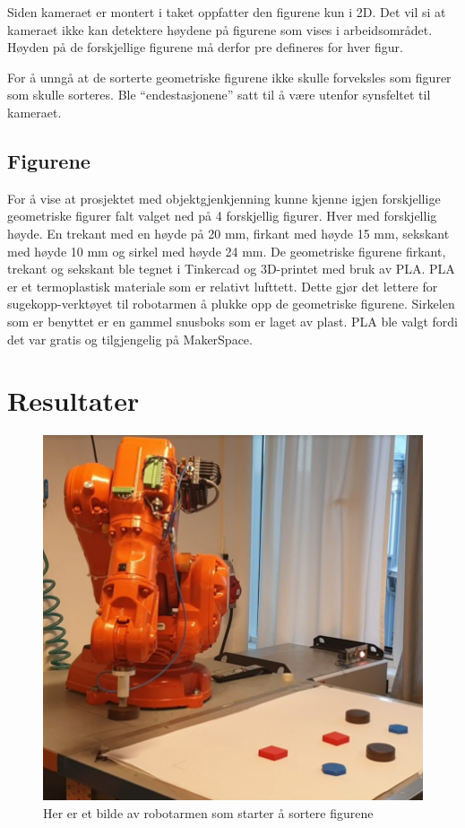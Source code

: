 \documentclass[conference]{IEEEtran}
\begin{document}

        Siden kameraet er montert i taket oppfatter den figurene kun i 2D. Det vil si at kameraet ikke kan detektere høydene på figurene som vises i arbeidsområdet. Høyden på de forskjellige figurene må derfor pre defineres for hver figur. 

        For å unngå at de sorterte geometriske figurene ikke skulle forveksles som figurer som skulle sorteres. Ble “endestasjonene” satt til å være utenfor synsfeltet til kameraet.

    \subsection{Figurene}
        For å vise at prosjektet med objektgjenkjenning kunne kjenne igjen forskjellige geometriske figurer falt valget ned på 4 forskjellig figurer. Hver med forskjellig høyde. En trekant med en høyde på 20 mm, firkant med høyde 15 mm, sekskant med høyde 10 mm og sirkel med høyde 24 mm. 
        De geometriske figurene firkant, trekant og sekskant ble tegnet i Tinkercad \cite{metode:tinkercad} og 3D-printet med bruk av PLA. PLA er et termoplastisk materiale som er relativt lufttett. Dette gjør det lettere for sugekopp-verktøyet til robotarmen å plukke opp de geometriske figurene. Sirkelen som er benyttet er en gammel snusboks som er laget av plast. PLA ble valgt fordi det var gratis og tilgjengelig på MakerSpace.

        
\section{Resultater}
    \begin{figure}[!htb]
        \centering
        \includegraphics[width=.8\linewidth]{images/robotarm1.png}
        \caption{Her er et bilde av robotarmen som starter å sortere figurene}
        \label{resultat:robotarm}
    \end{figure}
\end{document}
